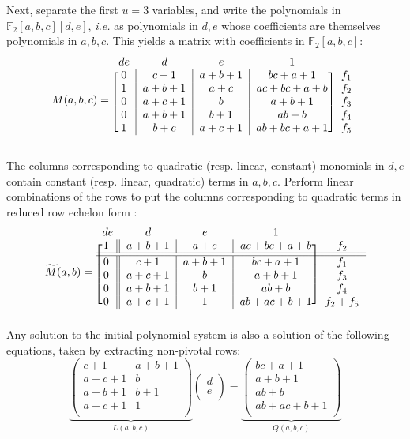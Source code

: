 \documentclass[a4paper,UKenglish,cleveref, autoref]{lipics-v2019}
\begin{document}
Next, separate the first $u=3$ variables, and write the polynomials in
$\mathbb{F}_2[a,b,c][d,e]$, \textit{i.e.} as polynomials in $d, e$ whose
coefficients are themselves polynomials in $a, b, c$. This yields a matrix with
coefficients in $\mathbb{F}_2[a,b,c]$:
\begin{equation}
\label{eq:example_matrix}
M(a,b,c) = \begin{blockarray}{ccccc}
de & d & e & 1 & \\
\begin{block}{[c|c|c|c]c}
0 & c+1 & a+b+1 & bc + a + 1 & f_1\\
1 & a+b+1 & a+c  & ac +bc + a+b & f_2\\
0 & a+c+1 & b & a+b+1          & f_3 \\
0 & a+b+1 & b+1 & ab+b  & f_4 \\
1 & b+c & a+c+1 & ab+bc+a+1 & f_5 \\
\end{block}
\end{blockarray}
\end{equation}

The columns corresponding to quadratic (resp. linear, constant) monomials in
$d,e$ contain constant (resp. linear, quadratic) terms in $a,b,c$. Perform
linear combinations of the rows to put the columns corresponding to quadratic
terms in reduced row echelon form :
\[
\widetilde M(a,b) = \begin{blockarray}{ccccc}
de & d & e & 1 & \\
\begin{block}{[c||c|c|c]c}
1 & a+b+1 & a+c     & ac +bc+a+b & f_2\\
\BAhline\BAhline
0 & c+1 & a+b+1 & bc + a + 1 & f_1\\
0 & a+c+1 & b & a+b+1          & f_3 \\
0 & a+b+1 & b+1 & ab+b  & f_4 \\
0 & a+c+1 & 1 & ab+ac +b+1 & f_2 + f_5 \\
\end{block}
\end{blockarray}
\]
Any solution to the initial polynomial system is also a solution of the
following equations, taken by extracting non-pivotal rows:
\[
\underbrace{\begin{pmatrix}
  c+1   & a+b+1 \\
  a+c+1 & b     \\
  a+b+1 & b+1   \\
  a+c+1 & 1     \\
  \end{pmatrix}}_{L(a,b,c)}
\begin{pmatrix}
d \\
e\\
\end{pmatrix}
=
\underbrace{\begin{pmatrix}
  bc + a + 1 \\       
  a + b + 1 \\  
  ab + b  \\             
  ab + ac + b + 1 \\
  \end{pmatrix}}_{Q(a,b,c)}
\]
\end{document}
